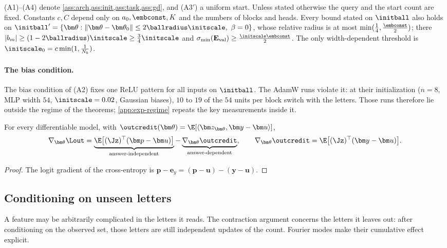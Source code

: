 (A1)--(A4) denote \cref{ass:arch,ass:init,ass:task,ass:gd}, and (A3$'$) a uniform start. Unless stated otherwise the query and the start
count are fixed. Constants $c,C$ depend only on $a_0,\embconst,K$ and the numbers of blocks and heads. Every bound stated on $\initball$ also
holds on $\initball'=\{\bm\theta:\|\bm\theta-\bm\theta_0\|\le2\ballradius\initscale,\ \beta=0\}$, whose relative radius is at most $\min(\frac{1}{4},\frac{\embconst}{2})$; there
$|b_m|\ge(1-2\ballradius)\initscale\ge\frac{3}{4}\initscale$ and $\sigma_{\min}(\mathbf E_{\mathrm{val}})\ge\frac{\initscale\embconst}{2}$. The only width-dependent threshold is $\initscale_0=c\min(1,\frac{1}{N_b})$.

\paragraph{The bias condition.}\label{rem:two-block-bias} The bias condition of (A2) fixes one ReLU pattern for all inputs on $\initball$. The AdamW runs violate it: at their initialization
($n=8$, MLP width $54$, $\initscale=0.02$, Gaussian biases), $10$ to $19$ of the $54$ units per block switch with the letters. Those
runs therefore lie outside the regime of the theorems; \cref{app:exp-regime} repeats the key measurements inside it.


\begin{lemma}
\label{lem:gradient-split}
For every differentiable model, with $\outcredit(\bm\theta)=\E[\langle\bm z_{\bm\theta},\bm y-\bm u\rangle]$,
\[
 \nabla_{\bm\theta}\Lout=\underbrace{\E\bigl[(\Jz)^\top(\bm p-\bm u)\bigr]}_{\text{answer-independent}}-\underbrace{\nabla_{\bm\theta}\outcredit}_{\text{answer-dependent}},\qquad
 \nabla_{\bm\theta}\outcredit=\E\bigl[(\Jz)^\top(\bm y-\bm u)\bigr].
\]
\end{lemma}

\begin{proof}
The logit gradient of the cross-entropy is $\bm p-\bm e_y=(\bm p-\bm u)-(\bm y-\bm u)$.
\end{proof}

\subsection{Conditioning on unseen letters}
\label{app:target-spectrum}

A feature may be arbitrarily complicated in the letters it reads. The contraction argument concerns the letters it leaves out:
after conditioning on the observed set, those letters are still independent updates of the count. Fourier modes make their
cumulative effect explicit.

